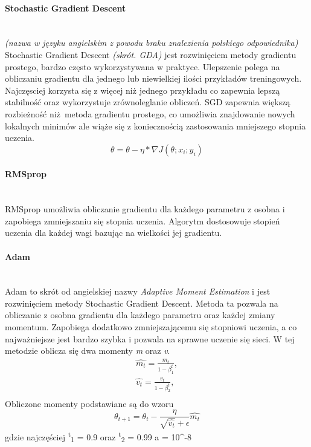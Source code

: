 \paragraph{Stochastic Gradient Descent} \mbox{}\\
\textit{(nazwa w języku angielskim z powodu braku znalezienia polskiego odpowiednika)}
Stochastic Gradient Descent \textit{(skrót. GDA)} jest rozwinięciem metody gradientu
prostego, bardzo często wykorzystywana w praktyce. Ulepszenie polega na obliczaniu
gradientu dla jednego lub niewielkiej ilości przykładów treningowych. Najczęsciej
korzysta się z więcej niż jednego przykładu co zapewnia lepszą stabilność oraz
wykorzystuje zrównoleglanie obliczeń. SGD zapewnia większą rozbieżność niż metoda
gradientu prostego, co umożliwia znajdowanie nowych lokalnych minimów ale wiąże się
z koniecznością zastosowania mniejszego stopnia uczenia.
\begin{equation}
\theta = \theta - \eta * \nabla J(\theta; x_i; y_i)
\end{equation}

\paragraph{RMSprop} \mbox{}\\
RMSprop umożliwia obliczanie gradientu dla każdego parametru z osobna i zapobiega
zmniejszaniu się stopnia uczenia. Algorytm dostosowuje stopień uczenia dla każdej wagi
bazując na wielkości jej gradientu.

\paragraph{Adam} \mbox{}\\
Adam to skrót od angielskiej nazwy \textit{Adaptive Moment Estimation} i jest rozwinięciem
metody Stochastic Gradient Descent. Metoda ta pozwala na obliczanie z osobna gradientu dla
każdego parametru oraz każdej zmiany momentum. Zapobiega dodatkowo zmniejszającemu się
stopniowi uczenia, a co najważniejsze jest bardzo szybka i pozwala na sprawne uczenie
się sieci. W tej metodzie oblicza się dwa momenty \textit{m} oraz \textit{v}.
\begin{equation}
\begin{align*}
\hat{m_t} = \frac{m_t} {1 - \beta^t_1}, \\
\hat{v_t} = \frac{v_t} {1 - \beta^t_2}, \\
\end{align*}
\end{equation}
Obliczone momenty podstawiane są do wzoru
\begin{equation}
\theta_{t+1} = \theta_t - \frac {\eta} {\sqrt{\hat{v_t}} + \epsilon} \hat{m_t}
\end{equation}
gdzie najczęściej \textbeta \textsuperscript{t}\textsubscript{1} = 0.9 oraz
\textbeta \textsuperscript{t}\textsubscript{2} = 0.99 a \straightepsilon = 10^{-8}\\

